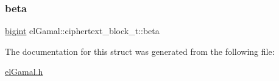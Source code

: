 \mbox{\label{structelGamal_1_1ciphertext__block__t_ab49b638b6d57044532b92dc6dece00af}} 
\subsubsection{\texorpdfstring{beta}{beta}}
{\footnotesize\ttfamily \mbox{\hyperlink{namespaceelGamal_ab2883bf41ce8d738e2428c8ae81b0245}{bigint}} el\+Gamal\+::ciphertext\+\_\+block\+\_\+t\+::beta}



The documentation for this struct was generated from the following file\+:\begin{DoxyCompactItemize}
\item 
\mbox{\hyperlink{elGamal_8h}{el\+Gamal.\+h}}\end{DoxyCompactItemize}
